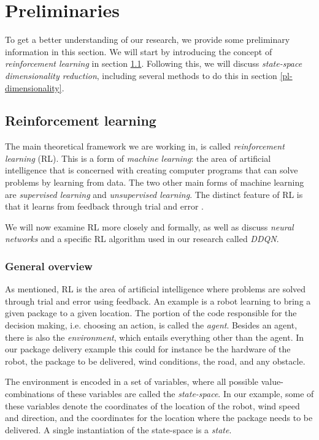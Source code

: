 \chapter{Preliminaries}\label{preliminaries}
To get a better understanding of our research, we provide some preliminary information in this section. We will start by introducing the concept of \emph{reinforcement learning} in section \ref{pl-rl}. Following this, we will discuss \emph{state-space dimensionality reduction}, including several methods to do this in section \ref{pl-dimensionality}.
 
\section{Reinforcement learning}\label{pl-rl}
The main theoretical framework we are working in, is called \emph{reinforcement learning} (RL). This is a form of \emph{machine learning}: the area of artificial intelligence that is concerned with creating computer programs that can solve problems by learning from data. The two other main forms of machine learning are \emph{supervised learning} and \emph{unsupervised  learning}. The distinct feature of RL is that it learns from feedback through trial and error \cite[p. 2-5]{grokking}.

We will now examine RL more closely and formally, as well as discuss \emph{neural networks} and a specific RL algorithm used in our research called \emph{DDQN}.

 
\subsection{General overview}
As mentioned, RL is the area of artificial intelligence where problems are solved through trial and error using feedback. An example is a robot learning to bring a given package to a given location. The portion of the code responsible for the decision making, i.e. choosing an action, is called the \emph{agent}. Besides an agent, there is also the \emph{environment}, which entails everything other than the agent. In our package delivery example this could for instance be the hardware of the robot, the package to be delivered, wind conditions, the road, and any obstacle.

The environment is encoded in a set of variables, where all possible value-combinations of these variables are called the \emph{state-space}. In our example, some of these variables denote the coordinates of the location of the robot, wind speed and direction, and the coordinates for the location where the package needs to be delivered. A single instantiation of the state-space is a \emph{state}. 

